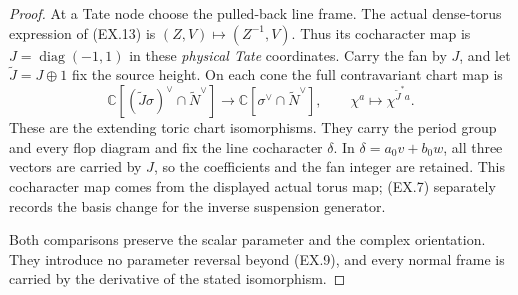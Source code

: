 \begin{proof}
At a Tate node choose the pulled-back line frame. The
actual dense-torus expression of (EX.13) is
\((Z,V)\mapsto(Z^{-1},V)\). Thus its cocharacter map is
\(J=\operatorname{diag}(-1,1)\) in these \emph{physical Tate}
coordinates. Carry the fan by \(J\), and let
\(\widetilde J=J\oplus1\) fix the source height. On each
cone the full contravariant chart map is
\[
 \mathbb C[(\widetilde J\sigma)^\vee\cap\widetilde N^\vee]
 \longrightarrow
 \mathbb C[\sigma^\vee\cap\widetilde N^\vee],
 \qquad\chi^a\longmapsto\chi^{\widetilde J^*a}.
 \tag{EX.14}
\]
These are the extending
toric chart isomorphisms. They carry the period group
and every flop diagram and fix the line cocharacter
\(\delta\). In \(\delta=a_0v+b_0w\), all three vectors
are carried by \(J\), so the coefficients and the fan
integer are retained. This cocharacter map comes from
the displayed actual torus map; (EX.7) separately records
the basis change for the inverse suspension generator.

Both comparisons preserve the scalar parameter and the
complex orientation. They introduce no parameter reversal
beyond (EX.9), and every normal frame is carried by the
derivative of the stated isomorphism.
\end{proof}
